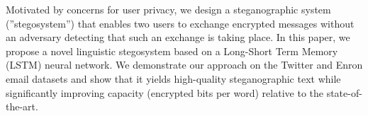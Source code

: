 Motivated by concerns for user privacy, we design a steganographic system (''stegosystem'') that enables two users to exchange encrypted messages without an adversary detecting that such an exchange is taking place. In this paper, we propose a novel linguistic stegosystem based on a Long-Short Term Memory (LSTM) neural network. We demonstrate our approach on the Twitter and Enron email datasets and show that it yields high-quality steganographic text while significantly improving capacity (encrypted bits per word) relative to the state-of-the-art.
